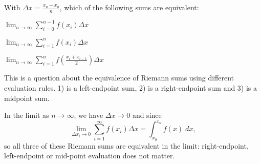 \documentclass{ximera}
\author{Emma Smith Zbarsky}
\begin{document}
\begin{exercise}

With $\Delta x = \frac{x_n-x_{0}}{n}$, which of the following sums are
equivalent:

{$\lim_{n\to\infty} \sum_{i=0}^{n-1} f(x_i) \Delta x$}

{$\lim_{n\to\infty} \sum_{i=1}^{n} f(x_i) \Delta x$}

{$\lim_{n\to\infty} \sum_{i=1}^{n} f\left(\frac{x_i+x_{i-1}}{2}\right) \Delta x$}


\begin{hint}
This is a question about the equivalence of Riemann sums using different
evaluation rules. 1) is a left-endpoint sum, 2) is a right-endpoint sum
and 3) is a midpoint sum.
\end{hint}


\begin{hint}
In the limit as $n\to \infty$, we have $\Delta x \to 0$ and since
\[\lim_{\Delta x_i \to 0} \sum_{i=1}^{\infty} f(x_i) \Delta x  = \int_{x_0}^{x_n}f(x) \; dx,\]
so all three of these Riemann sums are equivalent in the limit:
right-endpoint, left-endpoint or mid-point evaluation does not matter.
\end{hint}


\begin{multipleChoice}
\end{multipleChoice}

\end{exercise}
\end{document}
